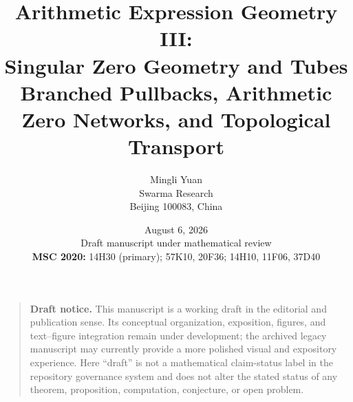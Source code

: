 \documentclass[11pt]{article}
\title{\textbf{Arithmetic Expression Geometry III:\\Singular Zero Geometry and Tubes}\\[0.45em]
\large Branched Pullbacks, Arithmetic Zero Networks, and Topological Transport}
\author{
Mingli Yuan\\
Swarma Research\\
Beijing 100083, China
}
\date{August 6, 2026\\[0.25em]
\small Draft manuscript under mathematical review\\[0.35em]
\small
\textbf{MSC 2020:} 14H30 (primary); 57K10, 20F36;
14H10, 11F06, 37D40}
\theoremstyle{definition}
\theoremstyle{remark}
\begin{document}
\maketitle

\begin{quote}\small
\textbf{Draft notice.}
This manuscript is a working draft in the editorial and publication sense.  Its
conceptual organization, exposition, figures, and text--figure integration remain
under development; the archived legacy manuscript may currently provide a more
polished visual and expository experience.  Here ``draft'' is not a mathematical
claim-status label in the repository governance system and does not alter the stated
status of any theorem, proposition, computation, conjecture, or open problem.
\end{quote}
\end{document}
